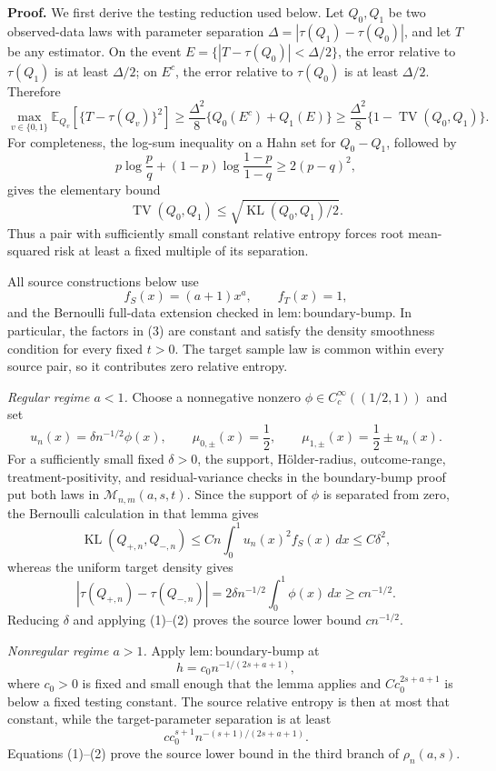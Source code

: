\textbf{Proof.}
We first derive the testing reduction used below.  Let \(Q_0,Q_1\) be two observed-data laws with parameter separation
\(\Delta=|\tau(Q_1)-\tau(Q_0)|\), and let \(T\) be any estimator.  On the event
\(E=\{|T-\tau(Q_0)|<\Delta/2\}\), the error relative to \(\tau(Q_1)\) is at least \(\Delta/2\); on \(E^c\), the error relative to \(\tau(Q_0)\) is at least \(\Delta/2\).  Therefore
\[
 \max_{v\in\{0,1\}}\mathbb E_{Q_v}
   [\{T-\tau(Q_v)\}^2]
 \ge \frac{\Delta^2}{8}
 \{Q_0(E^c)+Q_1(E)\}
 \ge \frac{\Delta^2}{8}
 \{1-\operatorname{TV}(Q_0,Q_1)\}.
\tag{1}
\]
For completeness, the log-sum inequality on a Hahn set for \(Q_0-Q_1\), followed by
\[
 p\log\frac pq+(1-p)\log\frac{1-p}{1-q}\ge2(p-q)^2,
\]
gives the elementary bound
\[
 \operatorname{TV}(Q_0,Q_1)
 \le\sqrt{\operatorname{KL}(Q_0,Q_1)/2}.
\tag{2}
\]
Thus a pair with sufficiently small constant relative entropy forces root mean-squared risk at least a fixed multiple of its separation.

All source constructions below use
\[
 f_S(x)=(a+1)x^a,
 \qquad f_T(x)=1,
\tag{3}
\]
and the Bernoulli full-data extension checked in \(\mathrm{lem:boundary\text{-}bump}\).  In particular, the factors in (3) are constant and satisfy the density smoothness condition for every fixed \(t>0\).  The target sample law is common within every source pair, so it contributes zero relative entropy.

\emph{Regular regime \(a<1\).}
Choose a nonnegative nonzero \(\phi\in C_c^\infty((1/2,1))\) and set
\[
 u_n(x)=\delta n^{-1/2}\phi(x),
 \qquad
 \mu_{0,\pm}(x)=\frac12,
 \qquad
 \mu_{1,\pm}(x)=\frac12\pm u_n(x).
\tag{4}
\]
For a sufficiently small fixed \(\delta>0\), the support, H\"older-radius, outcome-range, treatment-positivity, and residual-variance checks in the boundary-bump proof put both laws in \(\mathcal M_{n,m}(a,s,t)\).  Since the support of \(\phi\) is separated from zero, the Bernoulli calculation in that lemma gives
\[
 \operatorname{KL}(Q_{+,n},Q_{-,n})
 \le Cn\int_0^1u_n(x)^2f_S(x)\,dx
 \le C\delta^2,
\tag{5}
\]
whereas the uniform target density gives
\[
 |\tau(Q_{+,n})-\tau(Q_{-,n})|
 =2\delta n^{-1/2}\int_0^1\phi(x)\,dx
 \ge c n^{-1/2}.
\tag{6}
\]
Reducing \(\delta\) and applying (1)--(2) proves the source lower bound \(cn^{-1/2}\).

\emph{Nonregular regime \(a>1\).}
Apply \(\mathrm{lem:boundary\text{-}bump}\) at
\[
 h=c_0n^{-1/(2s+a+1)},
\tag{7}
\]
where \(c_0>0\) is fixed and small enough that the lemma applies and
\(Cc_0^{2s+a+1}\) is below a fixed testing constant.  The source relative entropy is then at most that constant, while the target-parameter separation is at least
\[
 cc_0^{s+1}n^{-(s+1)/(2s+a+1)}.
\tag{8}
\]
Equations (1)--(2) prove the source lower bound in the third branch of \(\rho_n(a,s)\).

